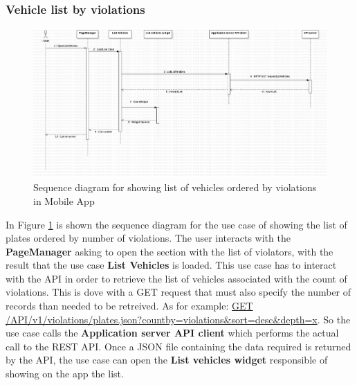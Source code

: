 \subsubsection{Vehicle list by violations}%
\begin{figure}[H]
\centering
\includegraphics[width=\textwidth]{Images/DDSeqAppList.png}
\caption{\label{fig:DDSeqAppList} Sequence diagram for showing list of vehicles ordered by violations in Mobile App }
\end{figure}

In Figure \ref{fig:DDSeqAppList} is shown the sequence diagram for the use case of showing the list of plates ordered by number of violations.
The user interacts with the \textbf{PageManager} asking to open the section with the list of violators, with the result that the use case \textbf{List Vehicles} is loaded. This use case has to interact with the API in order to retrieve the list of vehicles associated with the count of violations. This is dove with a GET request that must also specify the number of records than needed to be retreived. As for example: \url{GET} \url{/API/v1/violations/plates.json?countby=violations&sort=desc&depth=x}. So the use case calls the \textbf{Application server API client}  which performs the actual call to the REST API. Once a JSON file containing the data required is returned by the API, the use case can open the \textbf{List vehicles widget} responsible of showing on the app the list.


